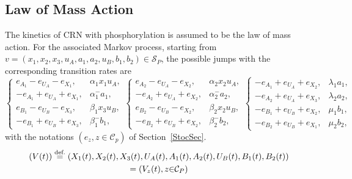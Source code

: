 \documentclass[english]{amsart}
\newcommand{\cal}[1]{\ensuremath{\mathcal{#1}}}
\newcommand\steq[1]{\stackrel{\text{\rm #1.}}{=}}
\numberwithin{proposition}{section}
\begin{document}
\subsection*{Law of Mass Action}\label{MassSec}
The kinetics of CRN with phosphorylation is assumed to be the law of mass action. For the associated Markov process, starting from $v{=}(x_1,x_2,x_3,u_A,a_1,a_2,u_B,b_1,b_2){\in}{\cal S}_P$, the possible jumps with the corresponding transition rates are 
\[
    \begin{cases}
\scriptstyle{e_{A_1}{-}e_{U_A}{-}e_{X_1}}, &\scriptstyle{\alpha_1x_1u_A},\\
\scriptstyle{{-}e_{A_1}{+}e_{U_A}{+}e_{X_1}}, & \scriptstyle{\alpha_1^-a_1},\\
\scriptstyle{e_{B_1}{-}e_{U_B}{-}e_{X_3}}, & \scriptstyle{\beta_1x_3u_B},\\
\scriptstyle{{-}e_{B_1}{+}e_{U_B}{+}e_{X_3}}, & \scriptstyle{\beta_1^-b_1},
\end{cases}
\begin{cases}
\scriptstyle{e_{A_2}{-}e_{U_A}{-}e_{X_2}}, &\scriptstyle{\alpha_2x_2u_A},\\
\scriptstyle{{-}e_{A_2}{+}e_{U_A}{+}e_{X_2}}, &\scriptstyle{\alpha_2^-a_2},\\
\scriptstyle{e_{B_2}{-}e_{U_B}{-}e_{X_2}}, &\scriptstyle{\beta_2x_2u_B},\\
\scriptstyle{{-}e_{B_2}{+}e_{U_B}{+}e_{X_2}}, &\scriptstyle{\beta_2^-b_2},
\end{cases}
\begin{cases}
\scriptstyle{{-}e_{A_1}{+}e_{U_A}{+}e_{X_2}}, &\scriptstyle{\lambda_1a_1},\\
\scriptstyle{{-}e_{A_2}{+}e_{U_A}{+}e_{X_3}}, &\scriptstyle{\lambda_2a_2},\\
\scriptstyle{{-}e_{B_1}{+}e_{U_B}{+}e_{X_2}}, &\scriptstyle{\mu_1b_1},\\
\scriptstyle{{-}e_{B_2}{+}e_{U_B}{+}e_{X_1}}, &\scriptstyle{\mu_2b_2},
\end{cases}
\]
with the notations $(e_z, z{\in}{\cal C}_p)$ of Section~\ref{StocSec}.
\begin{multline*}
(V(t))\steq{def} (X_1(t), X_2(t), X_3(t), U_A(t), A_1(t), A_2(t), U_B(t), B_1(t), B_2(t))\\=(V_{z}(t), z{\in}\cal{C}_P)
\end{multline*}
\end{document}

